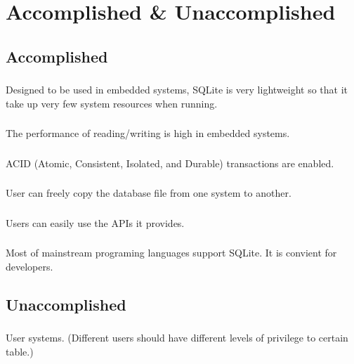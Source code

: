 \documentclass[journal]{IEEEtran}
\begin{document}
\section{Accomplished \& Unaccomplished}
\subsection{Accomplished}
\subsubsection{}
Designed to be used in embedded systems, SQLite is very lightweight so that it take up very few system resources when running.

\subsubsection{}
The performance of reading/writing is high in embedded systems.

\subsubsection{}
ACID (Atomic, Consistent, Isolated, and Durable) transactions are enabled.

\subsubsection{}
User can freely copy the database file from one system to another.

\subsubsection{}
Users can easily use the APIs it provides.

\subsubsection{}
Most of mainstream programing languages support SQLite. It is convient for developers.


\subsection{Unaccomplished}
\subsubsection{}
User systems. (Different users should have different levels of privilege to certain table.)
\end{document}
